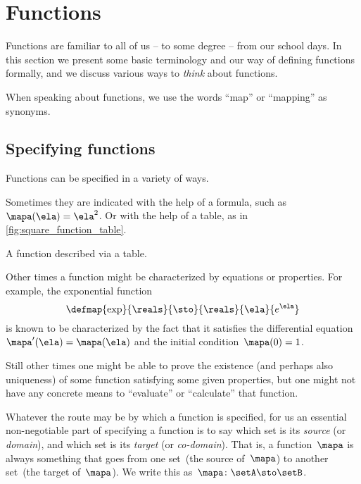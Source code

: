
\section{Functions}
\label{sec:functions}

Functions are familiar to all of us -- to some degree -- from our school days.
In this section we present some basic terminology and our way of defining functions formally, and we discuss various ways to \emph{think} about functions.

When speaking about functions, we use the words ``map'' or ``mapping'' as synonyms.

\subsection{Specifying functions}
\label{sec:domain-codomain}

Functions can be specified in a variety of ways.

Sometimes they are indicated with the help of a formula, such as~$\mapa(\ela)=\ela^2$.
Or with the help of a table, as in \cref{fig:square_function_table}.

\begin{marginfigure}
    \centering
    \caption{A function described via a table.}
    \label{fig:square_function_table}
\end{marginfigure}

Other times a function might be characterized by equations or properties.
For example, the exponential function
\begin{equation}
    \defmap{
        \exp
    }{
        \reals
    }{
        \sto
    }{
        \reals
    }{
        \ela
    }{
        e^\ela
    }
\end{equation}
is known to be characterized by the fact that it satisfies the differential equation~$\mapa'(\ela) = \mapa(\ela)$ and the initial condition~$\mapa(0) =1$.

Still other times one might be able to prove the existence (and perhaps also uniqueness) of some function satisfying some given properties, but one might not have any concrete means to ``evaluate'' or ``calculate'' that function.

Whatever the route may be by which a function is specified, for us an essential non-negotiable part of specifying a function is to say which set is its \emph{source} (or \emph{domain}), and which set is its \emph{target} (or \emph{co-domain}).
That is, a function~$\mapa$ is always something that goes from one set~\setA (the source of~$\mapa$) to another set~\setB (the target of~$\mapa$).
We write this as~$\mapa\colon \setA \sto \setB$.

